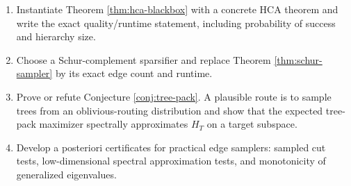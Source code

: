 \documentclass[11pt]{article}
\begin{document}
\begin{enumerate}
\item Instantiate Theorem \ref{thm:hca-blackbox} with a concrete HCA theorem
and write the exact quality/runtime statement, including probability of
success and hierarchy size.
\item Choose a Schur-complement sparsifier and replace Theorem
\ref{thm:schur-sampler} by its exact edge count and runtime.
\item Prove or refute Conjecture \ref{conj:tree-pack}.  A plausible route is
to sample trees from an oblivious-routing distribution and show that the
expected tree-pack maximizer spectrally approximates $H_T$ on a target
subspace.
\item Develop a posteriori certificates for practical edge samplers: sampled
cut tests, low-dimensional spectral approximation tests, and monotonicity of
generalized eigenvalues.
\end{enumerate}



\end{document}

